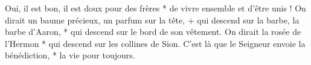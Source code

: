 Oui, il est bon, il est doux pour des frères * de vivre ensemble et d'être unis !
\versseparator
On dirait un baume précieux, un parfum sur la tête, + qui descend sur la barbe, la barbe d'Aaron, * qui descend sur le bord de son vêtement.
\versseparator
On dirait la rosée de l'Hermon * qui descend sur les collines de Sion. C'est là que le Seigneur envoie la bénédiction, * la vie pour toujours.
